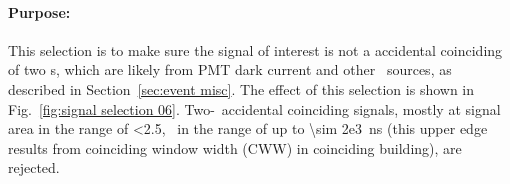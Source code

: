 \paragraph{Purpose:}
This selection is to make sure the signal of interest is not a accidental coinciding of two \sphe s, which are likely from PMT dark current and other \sphe\ sources, as described in Section~\ref{sec:event misc}. %
The effect of this selection is shown in Fig.~\ref{fig:signal selection 06}. Two-\sphe\ accidental coinciding signals, mostly at signal area in the range of \SI{<2.5}{\phe}, \rpd\ in the range of up to \SI{\sim 2e3}{\ns} (this upper edge results from coinciding window width (CWW) in coinciding building), are rejected.

